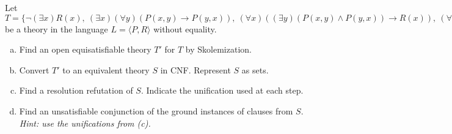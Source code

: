 \begin{problem}

    Let $T=\{\neg(\exists x) R(x),\ (\exists x)(\forall y)(P(x,y)\to P(y,x)),\ (\forall x)((\exists y)(P(x,y)\wedge P(y,x))\to R(x)),\ (\forall x)(\exists y)P(x,y)\}$ be a theory in the language $L=\langle P,R\rangle$ without equality.

    \begin{enumerate}[(a)]
        \item Find an open equisatisfiable theory $T'$ for $T$ by Skolemization.
        \item Convert $T'$ to an equivalent theory $S$ in CNF. Represent $S$ as sets.
        \item Find a resolution refutation of $S$. Indicate the unification used at each step.
        \item Find an unsatisfiable conjunction of the ground instances of clauses from $S$. {\it Hint: use the unifications from (c).}       
    \end{enumerate}

    \begin{solution}
        

\end{solution}
\end{problem}
